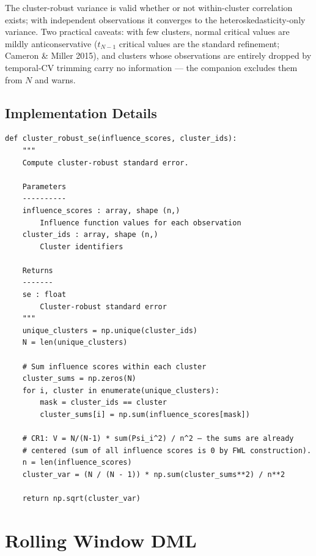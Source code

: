 \begin{remark}
The cluster-robust variance is valid whether or not within-cluster
correlation exists; with independent observations it converges to the
heteroskedasticity-only variance. Two practical caveats: with few clusters,
normal critical values are mildly anticonservative ($t_{N-1}$ critical values
are the standard refinement; Cameron \& Miller 2015), and clusters whose
observations are entirely dropped by temporal-CV trimming carry no
information — the companion excludes them from $N$ and warns.
\end{remark}

\subsection{Implementation Details}

\begin{verbatim}
def cluster_robust_se(influence_scores, cluster_ids):
    """
    Compute cluster-robust standard error.

    Parameters
    ----------
    influence_scores : array, shape (n,)
        Influence function values for each observation
    cluster_ids : array, shape (n,)
        Cluster identifiers

    Returns
    -------
    se : float
        Cluster-robust standard error
    """
    unique_clusters = np.unique(cluster_ids)
    N = len(unique_clusters)

    # Sum influence scores within each cluster
    cluster_sums = np.zeros(N)
    for i, cluster in enumerate(unique_clusters):
        mask = cluster_ids == cluster
        cluster_sums[i] = np.sum(influence_scores[mask])

    # CR1: V = N/(N-1) * sum(Psi_i^2) / n^2 — the sums are already
    # centered (sum of all influence scores is 0 by FWL construction).
    n = len(influence_scores)
    cluster_var = (N / (N - 1)) * np.sum(cluster_sums**2) / n**2

    return np.sqrt(cluster_var)
\end{verbatim}

\section{Rolling Window DML}\label{sec:ch06_rolling_window}

